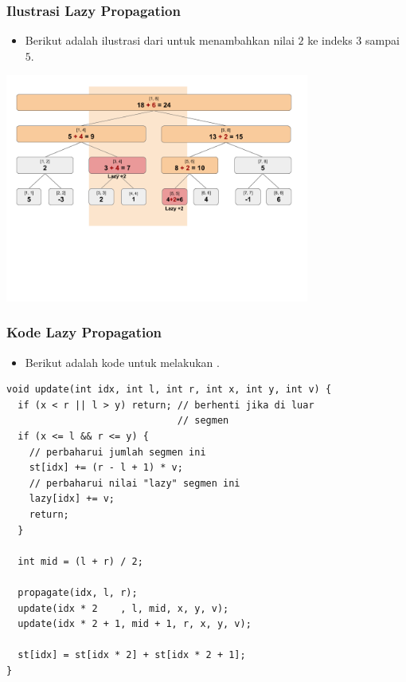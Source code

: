 \begin{frame}
\frametitle{Ilustrasi Lazy Propagation}
\begin{itemize}
  \item Berikut adalah ilustrasi dari \flazyPropagation untuk menambahkan nilai $2$ ke indeks $3$ sampai $5$.
\end{itemize}
\begin{center}
  \includegraphics[width=10cm]{asset/segtree-update-lazy.png}
\end{center}
\end{frame}

\begin{frame}[fragile]
\frametitle{Kode Lazy Propagation}
\begin{itemize}
  \item Berikut adalah kode untuk melakukan \flazyPropagation.
\end{itemize}
\begin{lstlisting}
void update(int idx, int l, int r, int x, int y, int v) {
  if (x < r || l > y) return; // berhenti jika di luar
                              // segmen
  if (x <= l && r <= y) {
    // perbaharui jumlah segmen ini
    st[idx] += (r - l + 1) * v;     
    // perbaharui nilai "lazy" segmen ini
    lazy[idx] += v;                 
    return;
  }
  
  int mid = (l + r) / 2;

  propagate(idx, l, r);
  update(idx * 2    , l, mid, x, y, v);
  update(idx * 2 + 1, mid + 1, r, x, y, v);
  
  st[idx] = st[idx * 2] + st[idx * 2 + 1];
}
\end{lstlisting}
\end{frame}

